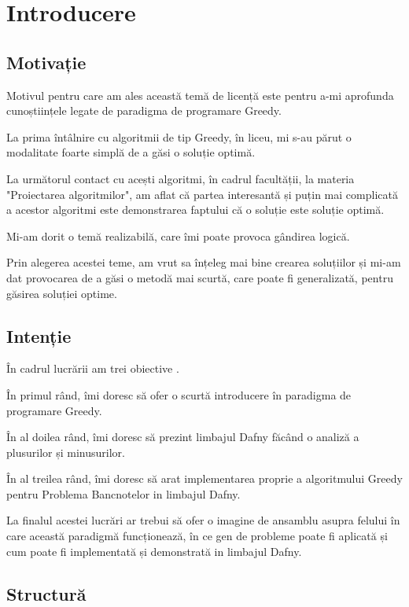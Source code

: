 \chapter{Introducere}
\section{Motivație} 

Motivul pentru care am ales această temă de licență este pentru a-mi aprofunda cunoștiințele legate de paradigma de programare Greedy. \par
La prima întâlnire cu algoritmii de tip Greedy, în liceu, mi s-au părut o modalitate foarte simplă de a găsi o soluție optimă. \par
La următorul contact cu acești algoritmi, în cadrul facultății, la materia "Proiectarea algoritmilor", 
 am aflat că partea interesantă și puțin mai complicată a acestor algoritmi este demonstrarea faptului că o soluție este soluție optimă. \par 
Mi-am dorit o temă realizabilă, care îmi poate provoca gândirea logică.\par
Prin  alegerea acestei teme, am vrut sa înțeleg mai bine crearea soluțiilor și
mi-am dat provocarea de a găsi o metodă mai scurtă, care poate fi generalizată, pentru găsirea soluției optime.

\section{Intenție} 

În cadrul lucrării am trei obiective .\par
În primul rând, îmi doresc să ofer o scurtă introducere în paradigma de programare Greedy.\par
În al doilea rând, îmi doresc să prezint limbajul Dafny făcând o analiză a plusurilor și minusurilor.\par
În al treilea rând, îmi doresc să arat implementarea proprie a algoritmului Greedy pentru Problema Bancnotelor in limbajul Dafny.\par

La finalul acestei lucrări ar trebui să ofer o imagine de ansamblu 
asupra felului în care această paradigmă funcționează, în ce gen de probleme poate fi aplicată și cum poate fi
implementată și demonstrată in limbajul Dafny. 

\section{Structură} 

